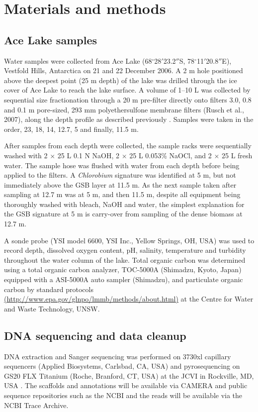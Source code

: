 
\section{Materials and methods}
\label{sec:ace_mm}
\subsection{Ace Lake samples}
Water samples were collected from Ace Lake (68$^{\circ}$28$'$23.2$''$S, 78$^{\circ}$11$'$20.8$''$E), Vestfold Hills, Antarctica on 21 and 22 December 2006. 
A 2 m hole positioned above the deepest point (25 m depth) of the lake was drilled through the ice cover of Ace Lake to reach the lake surface.
A volume of 1--10 L was collected by sequential size fractionation through a 20 \textmu{}m pre-filter directly onto filters 3.0, 0.8 and 0.1 \textmu{}m pore-sized, 293 mm polyethersulfone membrane filters (Rusch et al., 2007), along the depth profile as described previously \cite{Ng2010a}.
Samples were taken in the order, 23, 18, 14, 12.7, 5 and finally, 11.5 m.

After samples from each depth were collected, the sample racks were sequentially washed with 2 $\times$ 25 L 0.1 N NaOH, 2 $\times$ 25 L 0.053\% NaOCl, and 2 $\times$ 25 L fresh water. 
The sample hose was flushed with water from each depth before being applied to the filters. 
A \emph{Chlorobium} signature was identified at 5 m, but not immediately above the \ac{GSB} layer at 11.5 m. 
As the next sample taken after sampling at 12.7 m was at 5 m, and then 11.5 m, despite all equipment being thoroughly washed with bleach, NaOH and water, 
the simplest explanation for the \ac{GSB} signature at 5 m is carry-over from sampling of the dense biomass at 12.7 m. 

A sonde probe (\textsc{YSI} model 6600, \textsc{YSI} Inc., Yellow Springs, \textsc{OH}, \textsc{USA}) was used to record depth, dissolved oxygen content, pH, salinity, temperature and turbidity throughout the water column of the lake. 
Total organic carbon was determined using a total organic carbon analyzer, TOC-5000A (Shimadzu, Kyoto, Japan) equipped with a \textsc{ASI}-5000A auto sampler (Shimadzu), and particulate organic carbon by standard protocols 
\url{(http://www.epa.gov/glnpo/lmmb/methods/about.html)} 
at the Centre for Water and Waste Technology, \textsc{UNSW}.

\subsection{\textsc{DNA} sequencing and data cleanup}
\textsc{DNA} extraction and Sanger sequencing was performed on 3730xl capillary sequencers (Applied Biosystems, Carlsbad, \textsc{CA}, \textsc{USA}) and pyrosequencing on \textsc{GS20 FLX} Titanium (Roche, Branford, \textsc{CT}, \textsc{USA}) at the \acl{JCVI} in Rockville, \textsc{MD}, \textsc{USA} \cite{Rusch2007}. 
The scaffolds and annotations will be available via \ac{CAMERA} and public sequence repositories such as the \ac{NCBI} and the reads will be available via the \ac{NCBI} Trace Archive. 

